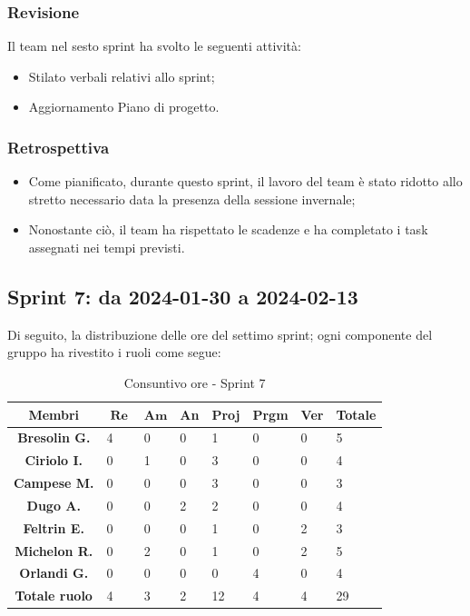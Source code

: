 \documentclass[10pt, a4paper]{article}
\begin{document}
\subsubsection{Revisione}
Il team nel sesto sprint ha svolto le seguenti attività:
\begin{itemize}
    \item Stilato verbali relativi allo sprint;
    \item Aggiornamento Piano di progetto.
\end{itemize}
\subsubsection{Retrospettiva}
\begin{itemize}
    \item Come pianificato, durante questo sprint, il lavoro del team è stato ridotto allo stretto necessario
    data la presenza della sessione invernale;
    \item Nonostante ciò, il team ha rispettato le scadenze e ha completato i task assegnati nei tempi previsti.
\end{itemize}

\subsection{Sprint 7: da 2024-01-30 a 2024-02-13}
Di seguito, la distribuzione delle ore del settimo sprint; ogni componente del gruppo ha rivestito i ruoli come segue:
\begin{table}[H]
    \begin{tabularx}{\textwidth}{c|X|X|X|X|X|X|X}
        \textbf{Membri} & $\operatorname{\textbf{Re}}$ & $\mathrm{\textbf{Am}}$ & \textbf{An} & \textbf{Proj} & \textbf{Prgm} & \textbf{Ver} & \textbf{Totale} \\
        \hline
        \textbf{Bresolin G.} & 4 & 0 & 0 & 1 & 0 & 0 & 5 \\
        \hline
        \textbf{Ciriolo I.}  & 0 & 1 & 0 & 3 & 0 & 0 & 4 \\
        \hline
        \textbf{Campese M.}  & 0 & 0 & 0 & 3 & 0 & 0 & 3 \\
        \hline
        \textbf{Dugo A.}     & 0 & 0 & 2 & 2 & 0 & 0 & 4 \\
        \hline
        \textbf{Feltrin E.}  & 0 & 0 & 0 & 1 & 0 & 2 & 3 \\
        \hline
        \textbf{Michelon R.} & 0 & 2 & 0 & 1 & 0 & 2 & 5 \\
        \hline
        \textbf{Orlandi G.}  & 0 & 0 & 0 & 0 & 4 & 0 & 4 \\
        \hline
        \textbf{Totale ruolo} & 4 & 3 & 2 & 12 & 4 & 4 & 29 \\
    \end{tabularx}
    \caption{Consuntivo ore - Sprint 7}
\end{table}
\end{document}
